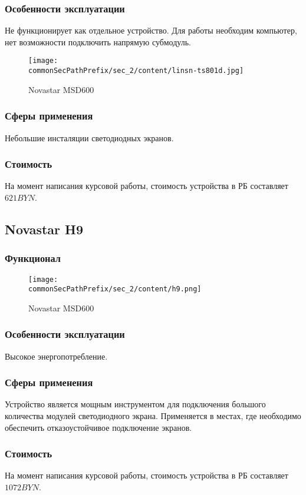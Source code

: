 \subsubsection{Особенности эксплуатации}
Не функционирует как отдельное устройство. Для работы необходим компьютер, нет возможности подключить напрямую субмодуль.
\begin{figure}[ht]
    \centering
    \texttt{[image: \\commonSecPathPrefix/sec\_2/content/linsn-ts801d.jpg]}
    \caption{Novastar MSD600}
\end{figure}
\subsubsection{Сферы применения}
Небольшие инсталяции светодиодных экранов.
\subsubsection{Стоимость}
На момент написания курсовой работы, стоимость устройства в РБ составляет \(621 BYN\).

\subsection{Novastar H9}
\subsubsection{Функционал}
\begin{figure}[ht]
    \centering
    \texttt{[image: \\commonSecPathPrefix/sec\_2/content/h9.png]}
    \caption{Novastar MSD600}
\end{figure}
\subsubsection{Особенности эксплуатации}
Высокое энергопотребление.
\subsubsection{Сферы применения}
Устройство является мощным инструментом для подключения большого количества модулей светодиодного экрана. Применяется в местах, где необходимо обеспечить отказоустойчивое подключение экранов.
\subsubsection{Стоимость}
На момент написания курсовой работы, стоимость устройства в РБ составляет \(1072 BYN\).
